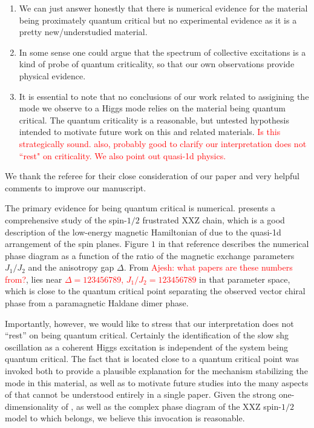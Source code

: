 \begin{enumerate}
\item We can just answer honestly that there is numerical evidence for the material being proximately quantum critical but no experimental evidence as it is a pretty new/understudied material.
\item In some sense one could argue that the spectrum of collective excitations is a kind of probe of quantum criticality, so that our own observations provide physical evidence.
\item It is essential to note that no conclusions of our work related to assigining the mode we observe to a Higgs mode relies on the material being quantum critical.
The quantum criticality is a reasonable, but untested hypothesis intended to motivate future work on this and related materials.
\textcolor{red}{Is this strategically sound. also, probably good to clarify our interpretation does not ``rest" on criticality. We also point out quasi-1d physics.}
\end{enumerate}


We thank the referee for their close consideration of our paper and very helpful comments to improve our manuscript.

The primary evidence for  being quantum critical is numerical.
\citet{furukawa_ground-state_2012} presents a comprehensive study of the spin-$1/2$ frustrated XXZ chain, which is a good description of the low-energy magnetic Hamiltonian of  due to the quasi-1d arrangement of the  spin planes.
Figure $1$ in that reference describes the numerical phase diagram as a function of the ratio of the magnetic exchange parameters $J_1/J_2$ and the anisotropy gap $\Delta$. 
From \textcolor{red}{Ajesh: what papers are these numbers from?},  lies near \textcolor{red}{$\Delta=\num{123456789}$, $J_1/J_2=\num{123456789}$} in that parameter space, which is close to the quantum critical point separating the observed vector chiral phase from a paramagnetic Haldane dimer phase.

Importantly, however, we would like to stress that our interpretation does not ``rest'' on  being quantum critical.
Certainly the identification of the slow \gls{shg} oscillation as a coherent Higgs excitation is independent of the system being quantum critical.
The fact that  is located close to a quantum critical point was invoked both to provide a plausible explanation for the mechanism stabilizing the mode in this material, as well as to motivate future studies into the many aspects of  that cannot be understood entirely in a single paper.
Given the strong one-dimensionality of , as well as the complex phase diagram of the XXZ spin-$1/2$ model to which  belongs, we believe this invocation is reasonable.

